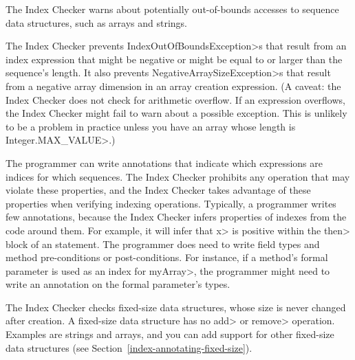 \htmlhr

The Index Checker warns about potentially out-of-bounds accesses to sequence
data structures, such as arrays
and strings.

The Index Checker prevents \<IndexOutOfBoundsException>s that result from
an index expression that might be negative or might be equal to or larger
than the sequence's length.
It also prevents \<NegativeArraySizeException>s that result from a negative
array dimension in an array creation expression.
(A caveat: the Index Checker does not check for arithmetic overflow. If
an expression overflows, the Index Checker might fail to warn about a
possible exception.  This is unlikely to be a problem in practice unless
you have an array whose length is \<Integer.MAX\_VALUE>.)

%

The programmer can write annotations that indicate which expressions are
indices for which sequences.  The Index Checker prohibits any operation that
may violate these properties, and the Index Checker takes advantage of
these properties when verifying indexing operations.
%
Typically, a programmer writes few annotations, because the Index Checker
infers properties of indexes from
the code around them. For example, it will infer that \<x> is positive
within the \<then> block of an  statement.
The programmer does need to write field types and method pre-conditions or post-conditions. For instance,
if a method's formal parameter is used as an index for
\<myArray>, the programmer might need to
write an 
annotation on the formal parameter's types.

The Index Checker checks fixed-size data structures, whose size is never
changed after creation.  A fixed-size data structure has no \<add> or
\<remove> operation.  Examples are strings and arrays, and you can add
support for other fixed-size data structures (see
Section~\ref{index-annotating-fixed-size}).

